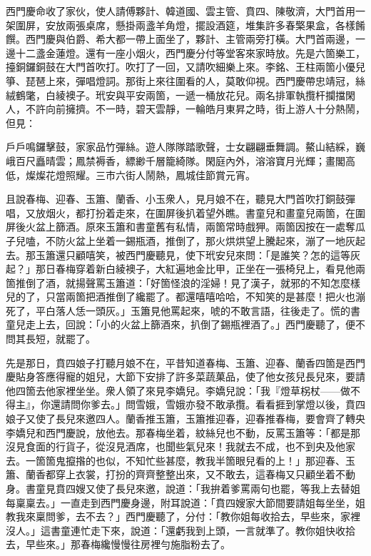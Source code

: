 西門慶命收了家伙，使人請傅夥計、韓道國、雲主管、賁四、陳敬濟，大門首用一架圍屏，安放兩張桌席，懸掛兩盞羊角燈，擺設酒筵，堆集許多春檠果盒，各樣餚饌。西門慶與伯爵、希大都一帶上面坐了，夥計、主管兩旁打橫。大門首兩邊，一邊十二盞金蓮燈。還有一座小烟火，西門慶分付等堂客來家時放。先是六箇樂工，擡銅鑼銅鼓在大門首吹打。吹打了一回，又請吹細樂上來。李銘、王柱兩箇小優兒箏、琵琶上來，彈唱燈詞。那街上來往圍看的人，莫敢仰視。西門慶帶忠靖冠，絲絨鶴氅，白綾襖子。玳安與平安兩箇，一遞一桶放花兒。兩名排軍執攬杆攔擋閑人，不許向前擁擠。不一時，碧天雲靜，一輪皓月東昇之時，街上游人十分熱鬧，但見：

\begin{myquote}
戶戶鳴鑼擊鼓，家家品竹彈絲。遊人隊隊踏歌聲，士女翩翩垂舞調。鰲山結綵，巍峨百尺矗晴雲；鳳禁褥香，縹緲千層籠綺隊。閑庭內外，溶溶寶月光輝；畫閣高低，燦燦花燈照耀。三市六街人鬧熱，鳳城佳節賞元宵。
\end{myquote}

且說春梅、迎春、玉簫、蘭香、小玉衆人，見月娘不在，聽見大門首吹打銅鼓彈唱，又放烟火，都打扮着走來，在圍屏後扒着望外瞧。書童兒和畫童兒兩箇，在圍屏後火盆上篩酒。原來玉簫和書童舊有私情，兩箇常時戲狎。兩箇因按在一處奪瓜子兒嗑，不防火盆上坐着一錫瓶酒，推倒了，那火烘烘望上騰起來，漰了一地灰起去。那玉簫還只顧嘻笑，被西門慶聽見，使下玳安兒來問：「是誰笑？怎的這等灰起？」那日春梅穿着新白綾襖子，大紅遍地金比甲，正坐在一張椅兒上，看見他兩箇推倒了酒，就揚聲罵玉簫道：「好箇怪浪的淫婦！見了漢子，就邪的不知怎麼樣兒的了，只當兩箇把酒推倒了纔罷了。都還嘻嘻哈哈，不知笑的是甚麼！把火也漰死了，平白落人恁一頭灰。」玉簫見他罵起來，唬的不敢言語，往後走了。慌的書童兒走上去，回說：「小的火盆上篩酒來，扒倒了錫瓶裡酒了。」西門慶聽了，便不問其長短，就罷了。

先是那日，賁四娘子打聽月娘不在，平昔知道春梅、玉簫、迎春、蘭香四箇是西門慶貼身答應得寵的姐兒，大節下安排了許多菜蔬菓品，使了他女孩兒長兒來，要請他四箇去他家裡坐坐。衆人領了來見李嬌兒。李嬌兒說：「我『燈草柺杖——做不得主』，你還請問你爹去。」問雪娥，雪娥亦發不敢承攬。看看捱到掌燈以後，賁四娘子又使了長兒來邀四人。蘭香推玉簫，玉簫推迎春，迎春推春梅，要會齊了轉央李嬌兒和西門慶說，放他去。那春梅坐着，紋絲兒也不動，反罵玉簫等：「都是那沒見食面的行貨子，從沒見酒席，也聞些氣兒來！我就去不成，也不到央及他家去。一箇箇鬼攛揝的也似，不知忙些甚麼，教我半箇眼兒看的上！」那迎春、玉簫、蘭香都穿上衣裳，打扮的齊齊整整出來，又不敢去，這春梅又只顧坐着不動身。書童見賁四嫂又使了長兒來邀，說道：「我拚着爹罵兩句也罷，等我上去替姐每稟稟去。」一直走到西門慶身邊，附耳說道：「賁四嫂家大節間要請姐每坐坐，姐教我來稟問爹，去不去？」西門慶聽了，分付：「教你姐每收拾去，早些來，家裡沒人。」這書童連忙走下來，說道：「還虧我到上頭，一言就準了。教你姐快收拾去，早些來。」那春梅纔慢慢往房裡勻施脂粉去了。

